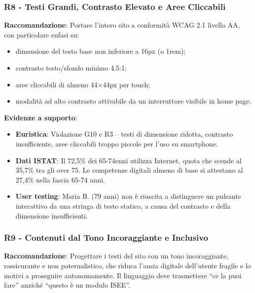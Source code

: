 \documentclass[11pt,a4paper]{article}
\begin{document}
\subsubsection{R8 - Testi Grandi, Contrasto Elevato e Aree Cliccabili}
\label{rec:R8}

\textbf{Raccomandazione}: Portare l'intero sito a conformit\`a WCAG 2.1 livello
AA, con particolare enfasi su:
\begin{itemize}
    \item dimensione del testo base non inferiore a 16px (o 1rem);
    \item contrasto testo/sfondo minimo 4.5:1;
    \item aree cliccabili di almeno 44×44px per touch;
    \item modalit\`a ad alto contrasto attivabile da un interruttore visibile
    in home page.
\end{itemize}

\textbf{Evidenze a supporto}:
\begin{itemize}
    \item \textbf{Euristica}: Violazione G10 e R3 -- testi di dimensione ridotta,
    contrasto insufficiente, aree cliccabili troppo piccole per l'uso su
    smartphone.
    \item \textbf{Dati ISTAT}: Il 72,5\% dei 65-74enni utilizza Internet,
    quota che scende al 35,7\% tra gli over 75. Le competenze digitali almeno
    di base si attestano al 27,4\% nella fascia 65-74 anni.
    \item \textbf{User testing}: Maria B. (79 anni) non \`e riuscita a distinguere
    un pulsante interattivo da una stringa di testo statico, a causa del
    contrasto e della dimensione insufficienti.
\end{itemize}

\subsubsection{R9 - Contenuti dal Tono Incoraggiante e Inclusivo}
\label{rec:R9}

\textbf{Raccomandazione}: Progettare i testi del sito con un tono
incoraggiante, rassicurante e non paternalistico, che riduca l'ansia
digitale dell'utente fragile e lo motivi a proseguire autonomamente.
Il linguaggio deve trasmettere ``ce la puoi fare'' anzich\'e ``questo \`e
un modulo ISEE''.
\end{document}
